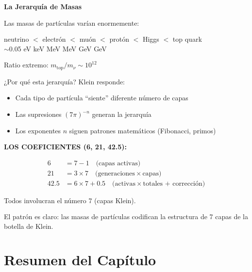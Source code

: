 \begin{nivelconceptual}
\textbf{La Jerarquía de Masas}

Las masas de partículas varían enormemente:

\begin{center}
neutrino $<$ electrón $<$ muón $<$ protón $<$ Higgs $<$ top quark\\
$\sim$0.05 eV  keV  MeV  MeV  GeV  GeV
\end{center}

Ratio extremo: $m_{\text{top}} / m_\nu \sim 10^{12}$

¿Por qué esta jerarquía? Klein responde:

\begin{itemize}
    \item Cada tipo de partícula ``siente'' diferente número de capas
    \item Las supresiones $(7\pi)^{-n}$ generan la jerarquía
    \item Los exponentes $n$ siguen patrones matemáticos (Fibonacci, primos)
\end{itemize}
\end{nivelconceptual}

\textbf{LOS COEFICIENTES (6, 21, 42.5):}

\begin{align}
6 &= 7 - 1 \quad \text{(capas activas)}\\
21 &= 3 \times 7 \quad \text{(generaciones} \times \text{capas)}\\
42.5 &= 6 \times 7 + 0.5 \quad \text{(activas} \times \text{totales + corrección)}
\end{align}

Todos involucran el número 7 (capas Klein).

El patrón es claro: las masas de partículas codifican la estructura
de 7 capas de la botella de Klein.


\section{Resumen del Capítulo}

